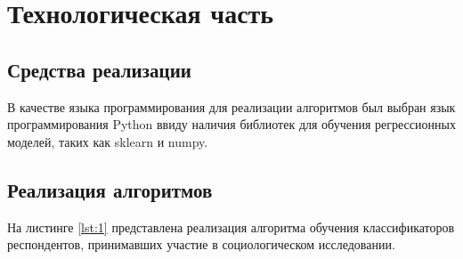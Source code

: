 \chapter{Технологическая часть}

\section{Средства реализации}

В качестве языка программирования для реализации алгоритмов был выбран язык программирования Python ввиду наличия библиотек для обучения регрессионных моделей, таких как sklearn и numpy.

\section{Реализация алгоритмов}

На листинге \ref{lst:1} представлена реализация алгоритма обучения классификаторов респондентов, принимавших участие в социологическом исследовании.

